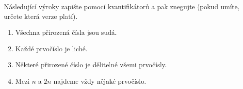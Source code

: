 Následující výroky zapište pomocí kvantifikátorů a pak znegujte (pokud umíte, určete která verze platí).
\begin{enumerate}

	\item  Všechna přirozená čísla jsou sudá.

	\item  Každé prvočíslo je liché.

	\item  Některé přirozené číslo je dělitelné všemi prvočísly.

	\item  Mezi $n$ a $2n$ najdeme vždy nějaké prvočíslo.

\end{enumerate}

